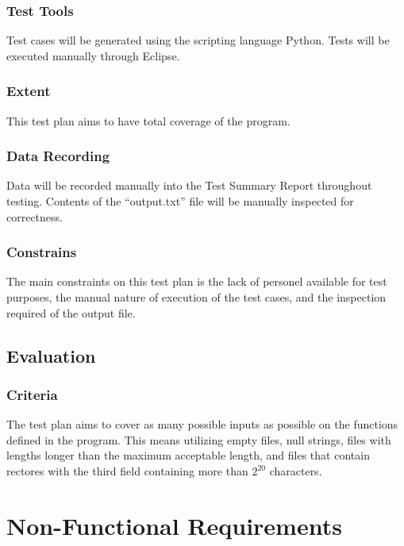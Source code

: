 \documentclass[]{article}
\begin{document}
	\subsubsection{Test Tools}
	Test cases will be generated using the scripting language Python.
	Tests will be executed manually through Eclipse.
	
	\subsubsection{Extent}
	This test plan aims to have total coverage of the program.
	
	\subsubsection{Data Recording}
	Data will be recorded manually into the Test Summary Report throughout testing.
	Contents of the ``output.txt'' file will be manually inspected for correctness.
	
	\subsubsection{Constrains}
	The main constraints on this test plan is the lack of personel available for
	test purposes, the manual nature of execution of the test cases, and the
	inspection required of the output file.

\subsection{Evaluation}
	\subsubsection{Criteria}
	The test plan aims to cover as many possible inputs as possible on the
	functions defined in the program.  This means utilizing empty files, null
	strings, files with lengths longer than the maximum acceptable length, and
	files that contain rectores with the third field containing more than $2^{20}$
	characters.
	


\section{Non-Functional Requirements}
\label{sec:non-functional_requirements}
\end{document}
